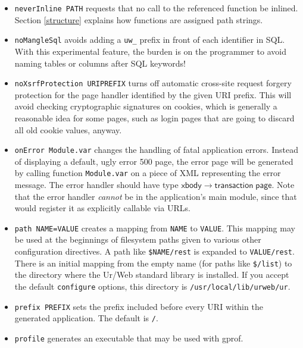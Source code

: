 \documentclass{article}
\newcommand{\mt}[1]{\mathsf{#1}}
\begin{document}
\begin{itemize}
\item \texttt{neverInline PATH} requests that no call to the referenced function be inlined.  Section \ref{structure} explains how functions are assigned path strings.
\item \texttt{noMangleSql} avoids adding a \texttt{uw\_} prefix in front of each identifier in SQL.  With this experimental feature, the burden is on the programmer to avoid naming tables or columns after SQL keywords!
\item \texttt{noXsrfProtection URIPREFIX} turns off automatic cross-site request forgery protection for the page handler identified by the given URI prefix.  This will avoid checking cryptographic signatures on cookies, which is generally a reasonable idea for some pages, such as login pages that are going to discard all old cookie values, anyway.
\item \texttt{onError Module.var} changes the handling of fatal application errors.  Instead of displaying a default, ugly error 500 page, the error page will be generated by calling function \texttt{Module.var} on a piece of XML representing the error message.  The error handler should have type $\mt{xbody} \to \mt{transaction} \; \mt{page}$.  Note that the error handler \emph{cannot} be in the application's main module, since that would register it as explicitly callable via URLs.
\item \texttt{path NAME=VALUE} creates a mapping from \texttt{NAME} to \texttt{VALUE}.  This mapping may be used at the beginnings of filesystem paths given to various other configuration directives.  A path like \texttt{\$NAME/rest} is expanded to \texttt{VALUE/rest}.  There is an initial mapping from the empty name (for paths like \texttt{\$/list}) to the directory where the Ur/Web standard library is installed.  If you accept the default \texttt{configure} options, this directory is \texttt{/usr/local/lib/urweb/ur}.
\item \texttt{prefix PREFIX} sets the prefix included before every URI within the generated application.  The default is \texttt{/}.
\item \texttt{profile} generates an executable that may be used with gprof.

\end{itemize}
\end{document}
